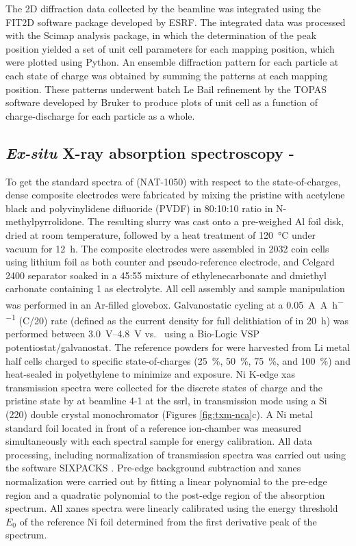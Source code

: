 \documentclass{article}
\begin{document}
The 2D diffraction data collected by the beamline was integrated using
the FIT2D software package developed by
ESRF\cite{hausermann1996,hammersley1997}. The integrated data was
processed with the Scimap analysis package\cite{scimap}, in which the
determination of the peak position yielded a set of unit cell
parameters for each mapping position, which were plotted using
Python. An ensemble diffraction pattern for each particle at each
state of charge was obtained by summing the patterns at each mapping
position. These patterns underwent batch Le Bail refinement by the
TOPAS software developed by Bruker to produce plots of unit cell as a
function of charge-discharge for each particle as a whole.

\subsection*{\textit{Ex-situ} X-ray absorption spectroscopy - \nca{}}
To get the standard spectra of \nca{} (NAT-1050) with respect to the
state-of-charges, dense composite electrodes were fabricated by mixing
the pristine \nca{} with acetylene black and polyvinylidene difluoride
(PVDF) in 80:10:10 ratio in N-methylpyrrolidone. The resulting slurry
was cast onto a pre-weighed Al foil disk, dried at room temperature,
followed by a heat treatment of \SI{120}{\celsius} under vacuum for
\SI{12}{\hour}. The composite electrodes were assembled in 2032 coin
cells using lithium foil as both counter and pseudo-reference
electrode, and Celgard 2400 separator soaked in a 45:55 mixture of
ethylenecarbonate and dmiethyl carbonate containing \SI{1}{\molar}
 as electrolyte. All cell assembly and sample manipulation
was performed in an Ar-filled glovebox. Galvanostatic cycling at a
\SI{0.05}{\ampere\per\ampere\per\hour} (C/20) rate (defined as the current
density for full delithiation of \nca{} in \SI{20}{\hour}) was
performed between \SIrange{3.0}{4.8}{\volt} vs.\  using a
Bio-Logic VSP potentiostat/galvanostat. The reference powders for
\nca{} were harvested from Li metal half cells charged to specific
state-of-charges (\SI{25}{\percent}, \SI{50}{\percent},
\SI{75}{\percent}, and \SI{100}{\percent}) and heat-sealed in
polyethylene to minimize  and  exposure. Ni K-edge
\gls{xas} transmission spectra were collected for the discrete states
of charge and the pristine state by at beamline 4-1 at the \gls{ssrl},
in transmission mode using a Si (220) double crystal monochromator
(Figures \ref{fig:txm-nca}c). A Ni metal standard foil located in
front of a reference ion-chamber was measured simultaneously with each
spectral sample for energy calibration. All data processing, including
normalization of transmission spectra was carried out using the
software {SIXPACKS} \cite{lai2011}. Pre-edge background subtraction
and \gls{xanes} normalization were carried out by fitting a linear
polynomial to the pre-edge region and a quadratic polynomial to the
post-edge region of the absorption spectrum. All \gls{xanes} spectra
were linearly calibrated using the energy threshold $E_0$ of the
reference Ni foil determined from the first derivative peak of the
spectrum.
\end{document}
